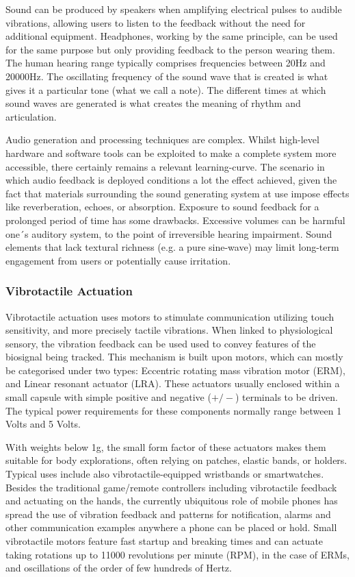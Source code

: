Sound can be produced by speakers when amplifying electrical pulses to audible vibrations, allowing users to listen to the feedback without the need for additional equipment. Headphones, working by the same principle, can be used for the same purpose but only providing feedback to the person wearing them. The human hearing range typically comprises frequencies between 20Hz and 20000Hz. The oscillating frequency of the sound wave that is created is what gives it a particular tone (what we call a note). The different times at which sound waves are generated is what creates the meaning of rhythm and articulation.

Audio generation and processing techniques are complex. Whilst high-level hardware and software tools can be exploited to make a complete system more accessible, there certainly remains a relevant learning-curve. The scenario in which audio feedback is deployed conditions a lot the effect achieved, given the fact that materials surrounding the sound generating system at use impose effects like reverberation, echoes, or absorption. Exposure to sound feedback for a prolonged period of time has some drawbacks. Excessive volumes can be harmful one´s auditory system, to the point of irreversible hearing impairment. Sound elements that lack textural richness (e.g. a pure sine-wave) may limit long-term engagement from users or potentially cause irritation.

\subsubsection{Vibrotactile Actuation}

Vibrotactile actuation uses motors to stimulate communication utilizing touch sensitivity, and more precisely tactile vibrations. When linked to physiological sensory, the vibration feedback can be used used to convey features of the biosignal being tracked. This mechanism is built upon motors, which can mostly be categorised under two types: Eccentric rotating mass vibration motor (ERM), and Linear resonant actuator (LRA). These actuators usually enclosed within a small capsule with simple positive and negative ($+/-$) terminals to be driven. The typical power requirements for these components normally range between 1 Volts and 5 Volts.

With weights below 1g, the small form factor of these actuators makes them suitable for body explorations, often relying on patches, elastic bands, or holders. Typical uses include also vibrotactile-equipped wristbands or smartwatches. Besides the traditional game/remote controllers including vibrotactile feedback and actuating on the hands, the currently ubiquitous role of mobile phones has spread the use of vibration feedback and patterns for notification, alarms and other communication examples anywhere a phone can be placed or hold. Small vibrotactile motors feature fast startup and breaking times and can actuate taking rotations up to 11000 revolutions per minute (RPM), in the case of ERMs, and oscillations of the order of few hundreds of Hertz.

